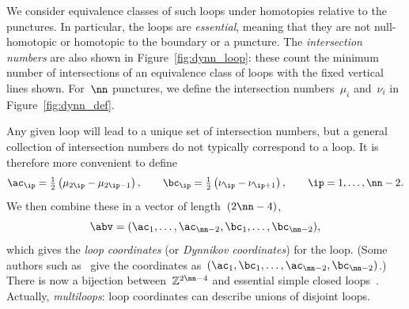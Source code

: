 \documentclass[12pt]{article}
\newcommand{\jlt}[1]{}
\renewcommand{\l}{\left}			%
\renewcommand{\r}{\right}			%
\begin{document}
%
We consider equivalence classes of such loops under homotopies
relative to the punctures.  In particular, the loops are
\emph{essential}, meaning that they are not null-homotopic or
homotopic to the boundary or a puncture.  The \emph{intersection
  numbers} are also shown in Figure~\ref{fig:dynn_loop}: these count
the minimum number of intersections of an equivalence class of loops
with the fixed vertical lines shown.  For~$\nn$ punctures, we define
the intersection numbers~$\mu_i$ and~$\nu_i$ in
Figure~\ref{fig:dynn_def}.

Any given loop will lead to a unique set of intersection numbers, but
a general collection of intersection numbers do not typically
correspond to a loop.  It is therefore more convenient to define
\begin{equation}
  \ac_\ip = \tfrac12\l(\mu_{2\ip} - \mu_{2\ip-1}\r), \qquad
  \bc_\ip = \tfrac12\l(\nu_\ip - \nu_{\ip+1}\r), \qquad
  \ip=1,\ldots,\nn-2.
\end{equation}
We then combine these in a vector of length~$(2\nn-4)$,
\begin{equation}
  \abv = (\ac_1,\ldots,\ac_{\nn-2},\bc_1,\ldots,\bc_{\nn-2}),
  \label{eq:abvdef}
\end{equation}
which gives the \emph{loop coordinates} (or \emph{Dynnikov
  coordinates}) for the loop.  (Some authors such
as~\citet{Dehornoy2008} give the coordinates
as~$(\ac_1,\bc_1,\ldots,\ac_{\nn-2},\bc_{\nn-2})$.)  There is now a
bijection between~$\mathbb{Z}^{2\nn-4}$ and essential simple closed
loops~\citep{Dynnikov2002,Moussafir2006,Hall2009,Thiffeault2010}.
Actually, \emph{multiloops}: loop coordinates can describe unions of
disjoint loops. \jlt{MRA suggests `You mention multiloops here in a
  sort of fragment thought at the end of the second paragraph.
  Perhaps leave this concept out till section 2.4.'}
\end{document}
